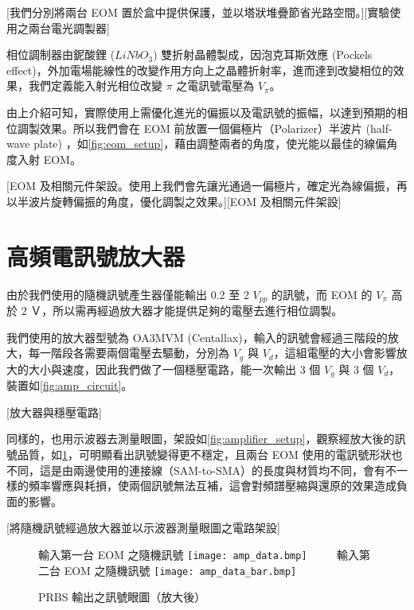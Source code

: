 \documentclass[class=NCU_thesis, crop=false]{standalone}
\begin{document}
[我們分別將兩台 EOM 置於盒中提供保護，並以塔狀堆疊節省光路空間。][實驗使用之兩台電光調製器]

相位調制器由鈮酸鋰 ($LiNbO_{3}$) 雙折射晶體製成，因泡克耳斯效應 (Pockels effect)，外加電場能線性的改變作用方向上之晶體折射率，進而達到改變相位的效果，我們定義能入射光相位改變 $\pi$ 之電訊號電壓為 $V_{\pi}$。

由上介紹可知，實際使用上需優化進光的偏振以及電訊號的振幅，以達到預期的相位調製效果。所以我們會在 EOM 前放置一個偏極片（Polarizer）半波片 (half-wave plate) ，如\cref{fig:eom_setup}，藉由調整兩者的角度，使光能以最佳的線偏角度入射 EOM。

[EOM 及相關元件架設。使用上我們會先讓光通過一偏極片，確定光為線偏振，再以半波片旋轉偏振的角度，優化調製之效果。][EOM 及相關元件架設]

\section{高頻電訊號放大器}

由於我們使用的隨機訊號產生器僅能輸出 0.2 至 2 $V_{pp}$ 的訊號，而 EOM 的 $V_{\pi}$ 高於 2 Ｖ，所以需再經過放大器才能提供足夠的電壓去進行相位調製。

我們使用的放大器型號為 OA3MVM (Centallax)，輸入的訊號會經過三階段的放大，每一階段各需要兩個電壓去驅動，分別為 $V_{g}$ 與 $V_{d}$，這組電壓的大小會影響放大的大小與速度，因此我們做了一個穩壓電路，能一次輸出 3 個 $V_{g}$ 與 3 個 $V_{d}$，裝置如\cref{fig:amp_circuit}。

[放大器與穩壓電路]

同樣的，也用示波器去測量眼圖，架設如\cref{fig:amplifier_setup}，觀察經放大後的訊號品質，如\cref{fig:amp_prbs_eye}，可明顯看出訊號變得更不穩定，且兩台 EOM 使用的電訊號形狀也不同，這是由兩邊使用的連接線（SAM-to-SMA）的長度與材質均不同，會有不一樣的頻率響應與耗損，使兩個訊號無法互補，這會對頻譜壓縮與還原的效果造成負面的影響。

[將隨機訊號經過放大器並以示波器測量眼圖之電路架設]

\begin{figure}[!hbt]
    \centering
    \subcaptionbox
        {輸入第一台 EOM 之隨機訊號
        \label{fig:subfig_fig1}}
        {\texttt{[image: amp\_data.bmp]}}
    ~~~~
    \subcaptionbox
        {輸入第二台 EOM 之隨機訊號
        \label{fig:subfig_fig2}}
        {\texttt{[image: amp\_data\_bar.bmp]}}
    \caption{PRBS 輸出之訊號眼圖（放大後）}
    \label{fig:amp_prbs_eye}
\end{figure}
\end{document}
